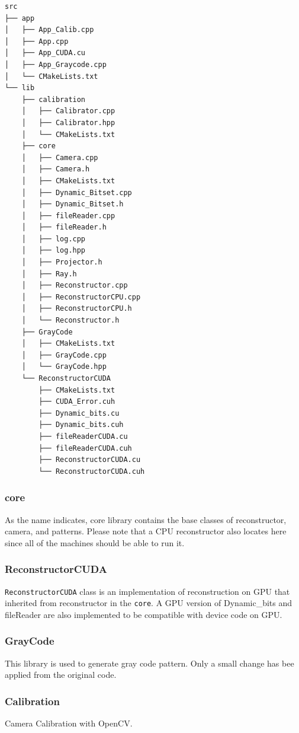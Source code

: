 \documentclass[final,12pt,3p]{elsarticle}
\begin{document}
\begin{verbatim}
src
├── app
│   ├── App_Calib.cpp
│   ├── App.cpp
│   ├── App_CUDA.cu
│   ├── App_Graycode.cpp
│   └── CMakeLists.txt
└── lib
    ├── calibration
    │   ├── Calibrator.cpp
    │   ├── Calibrator.hpp
    │   └── CMakeLists.txt
    ├── core
    │   ├── Camera.cpp
    │   ├── Camera.h
    │   ├── CMakeLists.txt
    │   ├── Dynamic_Bitset.cpp
    │   ├── Dynamic_Bitset.h
    │   ├── fileReader.cpp
    │   ├── fileReader.h
    │   ├── log.cpp
    │   ├── log.hpp
    │   ├── Projector.h
    │   ├── Ray.h
    │   ├── Reconstructor.cpp
    │   ├── ReconstructorCPU.cpp
    │   ├── ReconstructorCPU.h
    │   └── Reconstructor.h
    ├── GrayCode
    │   ├── CMakeLists.txt
    │   ├── GrayCode.cpp
    │   └── GrayCode.hpp
    └── ReconstructorCUDA
        ├── CMakeLists.txt
        ├── CUDA_Error.cuh
        ├── Dynamic_bits.cu
        ├── Dynamic_bits.cuh
        ├── fileReaderCUDA.cu
        ├── fileReaderCUDA.cuh
        ├── ReconstructorCUDA.cu
        └── ReconstructorCUDA.cuh
\end{verbatim}

\subsubsection{core}\label{core}

As the name indicates, core library contains the base classes of reconstructor, camera, and patterns. Please note that a CPU reconstructor also locates here since all of the machines should be able
to run it.

\subsubsection{ReconstructorCUDA}\label{reconstructorcuda}

\texttt{ReconstructorCUDA} class is an implementation of reconstruction
on GPU that inherited from reconstructor in the \texttt{core}. A GPU
version of Dynamic\_bits and fileReader are also implemented to be
compatible with device code on GPU.

\subsubsection{GrayCode}\label{graycode}

This library is used to generate gray code pattern. Only a small change
has bee applied from the original code.

\subsubsection{Calibration}\label{calibration}

Camera Calibration with OpenCV.




\end{document}
